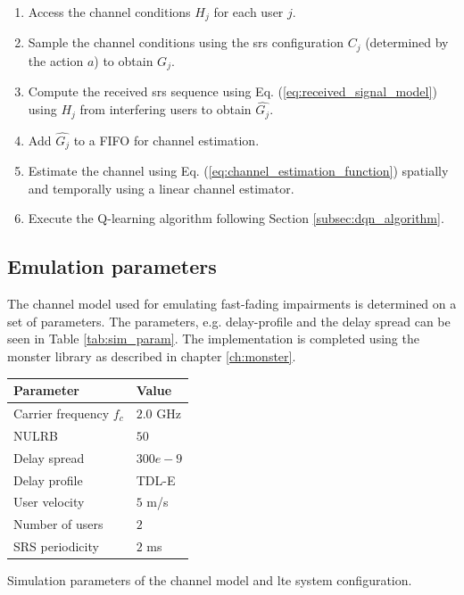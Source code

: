 \begin{enumerate}
    \item Access the channel conditions $H_j$ for each user $j$.
    \item Sample the channel conditions using the \gls{srs} configuration $C_j$ (determined by the action $a$) to obtain $G_j$.
    \item Compute the received \gls{srs} sequence using Eq. (\ref{eq:received_signal_model}) using $H_j$ from interfering users to obtain $\hat{G_j}$.
    \item Add $\hat{G_j}$ to a FIFO for channel estimation.
    \item Estimate the channel using Eq. (\ref{eq:channel_estimation_function}) spatially and temporally using a linear channel estimator.
    \item Execute the Q-learning algorithm following Section \ref{subsec:dqn_algorithm}.
\end{enumerate}

\subsection{Emulation parameters}
The channel model used for emulating fast-fading impairments is determined on a set of parameters. The parameters, e.g. delay-profile and the delay spread can be seen in Table \ref{tab:sim_param}. The implementation is completed using the \gls{monster} library as described in chapter \ref{ch:monster}. 

\begin{margintable}
\centering
\footnotesize{
\begin{tabular}{l|l}
\toprule
\textbf{Parameter}                 & \textbf{Value} \\ \midrule
Carrier frequency $f_c$ & $2.0$ GHz \\
NULRB         & $50$             \\
Delay spread  & $300e-9$         \\
Delay profile & TDL-E          \\
User velocity & $5$ m/s \\   
Number of users & $2$ \\
SRS periodicity & $2$ ms 
\end{tabular}
\vspace{1em}
\caption{Simulation parameters of the channel model and \gls{lte} system configuration.}
\label{tab:sim_param}
}
\end{margintable}


